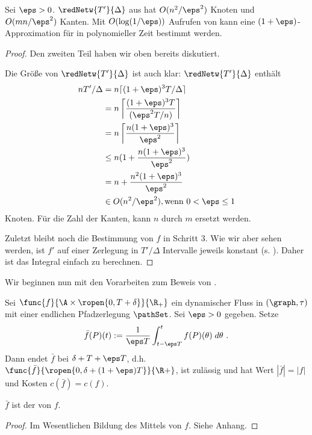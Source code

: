 \begin{theorem}
    Sei $\eps > 0$. $\redNetw{T'}{\Delta}$ aus  hat
    $O(n^2/\eps^2)$ Knoten und $O(mn/\eps^2)$ Kanten. Mit $O(\log(1/\eps))$
    Aufrufen von  kann eine $(1+\eps)$-Approximation
    für  in polynomieller Zeit bestimmt werden.
    \begin{proof}
        Den zweiten Teil haben wir oben bereits diskutiert.

        Die Größe von $\redNetw{T'}{\Delta}$ ist auch klar:
        $\redNetw{T'}{\Delta}$ enthält
        \begin{align*}
            n T'/\Delta & = n \lceil (1 + \eps)^3 T/\Delta \rceil \\
                        & = n \left\lceil \frac{(1 + \eps)^3T}{(\eps^2T/n)} \right\rceil \\
                        & = n \left\lceil \frac{n(1 + \eps)^3}{\eps^2} \right\rceil \\
                        & \leq n (1 + \frac{n(1 + \eps)^3}{\eps^2}) \\
                        & = n + \frac{n^2(1 + \eps)^3}{\eps^2} \\
                        & \in O(n^2/\eps^2), \text{wenn } 0 < \eps \leq 1
        \end{align*}
        Knoten. Für die Zahl der Kanten, kann $n$ durch $m$ ersetzt werden.


        Zuletzt bleibt noch die Bestimmung von $f$ in Schritt 3. Wie wir aber
        sehen werden, ist $f'$ auf einer Zerlegung in $T'/\Delta$ Intervalle
        jeweils konstant (s. ). Daher ist das Integral einfach
        zu berechnen.
    \end{proof}
\end{theorem}

Wir beginnen nun mit den Vorarbeiten zum Beweis von .

\begin{lemma}\label{lem:flow_avg}
    Sei $\func{f}{\A \times \ropen{0, T + \delta}}{\R_+}$ ein dynamischer Fluss in
    $(\graph, \tau)$ mit einer endlichen Pfadzerlegung $\pathSet$.
    Sei $\eps > 0$ gegeben. Setze
    \[
    \bar{f}(P)(t) := \frac{1}{\eps T}
                            \int_{t - \eps T}^{t} f(P)(\theta) \; d\theta \text{ .}
    \]
    Dann endet $\bar{f}$ bei $\delta + T + \eps T$,
    d.h. $\func{\bar{f}}{\ropen{0, \delta + (1+\eps)T}}{\R+}$, ist zulässig und hat Wert
    $|\bar{f}| = |f|$ und Kosten $c(\bar{f}) = c(f)$.

    $\bar{f}$ ist der  von $f$.

    \begin{proof}
        Im Wesentlichen Bildung des Mittels von $f$. Siehe Anhang.
    \end{proof}
\end{lemma}

